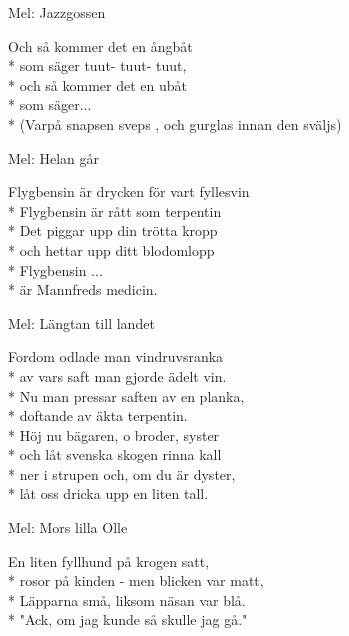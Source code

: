 \begin{SongText}[Ångbåten]
\begin{SongInfo}
    Mel: Jazzgossen
\end{SongInfo}
\begin{SongVerse}
    Och så kommer det en ångbåt\\*%
    som säger tuut- tuut- tuut,\\*%
    och så kommer det en ubåt\\*%
    som säger...\\*%
    (Varpå snapsen sveps , och gurglas innan den sväljs)
\end{SongVerse}
\end{SongText}
\begin{SongText}
\begin{SongInfo}
    Mel: Helan går
\end{SongInfo}
\begin{SongVerse}
    Flygbensin är drycken för vart fyllesvin\\*%
    Flygbensin är rått som terpentin\\*%
    Det piggar upp din trötta kropp\\*%
    och hettar upp ditt blodomlopp\\*%
    Flygbensin ...\\*%
    är Mannfreds medicin.
\end{SongVerse}
\end{SongText}
\begin{SongText}[Tallen]
\begin{SongInfo}
    Mel: Längtan till landet
\end{SongInfo}
\begin{SongVerse}
    Fordom odlade man vindruvsranka\\*%
    av vars saft man gjorde ädelt vin.\\*%
    Nu man pressar saften av en planka,\\*%
    doftande av äkta terpentin.\\*%
    Höj nu bägaren, o broder, syster\\*%
    och låt svenska skogen rinna kall\\*%
    ner i strupen och, om du är dyster,\\*%
    låt oss dricka upp en liten tall.
\end{SongVerse}
\end{SongText}
\begin{SongText}
\begin{SongInfo}
    Mel: Mors lilla Olle
\end{SongInfo}
\begin{SongVerse}
    En liten fyllhund på krogen satt,\\*%
    rosor på kinden - men blicken var matt,\\*%
    Läpparna små, liksom näsan var blå.\\*%
    "Ack, om jag kunde så skulle jag gå."
\end{SongVerse}
\end{SongText}
